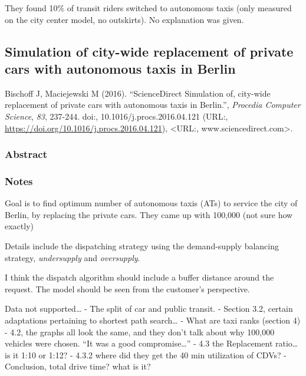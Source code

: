 \documentclass[
]{article}
\begin{document}
They found 10\% of transit riders switched to autonomous taxis (only
measured on the city center model, no outskirts). No explanation was
given.

\hypertarget{simulation-of-city-wide-replacement-of-private-cars-with-autonomous-taxis-in-berlin}{%
\subsection{Simulation of city-wide replacement of private cars with
autonomous taxis in
Berlin}\label{simulation-of-city-wide-replacement-of-private-cars-with-autonomous-taxis-in-berlin}}

Bischoff J, Maciejewski M (2016). ``ScienceDirect Simulation of,
city-wide replacement of private cars with autonomous taxis in
Berlin.'', \emph{Procedia Computer Science}, \emph{83}, 237-244. doi:,
10.1016/j.procs.2016.04.121 (URL:,
\url{https://doi.org/10.1016/j.procs.2016.04.121}), \textless URL:,
www.sciencedirect.com\textgreater.

\hypertarget{abstract-1}{%
\subsubsection{Abstract}\label{abstract-1}}

\hypertarget{notes-1}{%
\subsubsection{Notes}\label{notes-1}}

Goal is to find optimum number of autonomous taxis (ATs) to service the
city of Berlin, by replacing the private cars. They came up with 100,000
(not sure how exactly)

Details include the dispatching strategy using the demand-supply
balancing strategy, \emph{undersupply} and \emph{oversupply}.

I think the dispatch algorithm should include a buffer distance around
the request. The model should be seen from the customer's perspective.

Data not supported\ldots{} - The split of car and public transit. -
Section 3.2, certain adaptations pertaining to shortest path
search\ldots{} - What are taxi ranks (section 4) - 4.2, the graphs all
look the same, and they don't talk about why 100,000 vehicles were
chosen. ``It was a good compromise\ldots{}'' - 4.3 the Replacement
ratio\ldots{} is it 1:10 or 1:12? - 4.3.2 where did they get the 40 min
utilization of CDVs? - Conclusion, total drive time? what is it?
\end{document}
